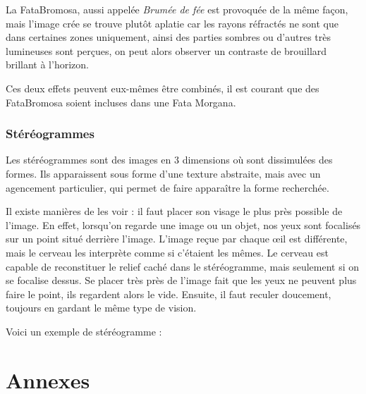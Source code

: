 \documentclass[a4paper, 12pt, onecolumn, openany]{report}
\begin{document}
	La FataBromosa, aussi appelée \textit{Brumée de fée} est provoquée de la même façon, mais l’image crée se trouve plutôt aplatie car les rayons réfractés ne sont que dans certaines zones uniquement, ainsi des parties sombres ou d’autres très lumineuses sont perçues,  on peut alors observer un contraste de brouillard brillant à l’horizon. 

Ces deux effets peuvent eux-mêmes être combinés, il est courant que des FataBromosa soient incluses dans une Fata Morgana. 

	\section{Stéréogrammes}
	Les stéréogrammes sont des images en 3 dimensions où sont dissimulées des formes. Ils apparaissent sous forme d’une texture abstraite, mais avec un agencement particulier, qui permet de faire apparaître la forme recherchée.
	
	Il existe manières de les voir : il faut placer son visage le plus près possible de l’image. En effet, lorsqu’on regarde une image ou un objet, nos yeux sont focalisés sur un point situé derrière l’image. L’image reçue par chaque œil est différente, mais le cerveau les interprète comme si c’étaient les mêmes. Le cerveau est capable de reconstituer le relief caché dans le stéréogramme, mais seulement si on se focalise dessus. Se placer très près de l’image fait que les yeux ne peuvent plus faire le point, ils regardent alors le vide. Ensuite, il faut reculer doucement, toujours en gardant le même type de vision. 
	
	Voici un exemple de stéréogramme :
	
\part*{Annexes}
\listoffigures
\end{document}
